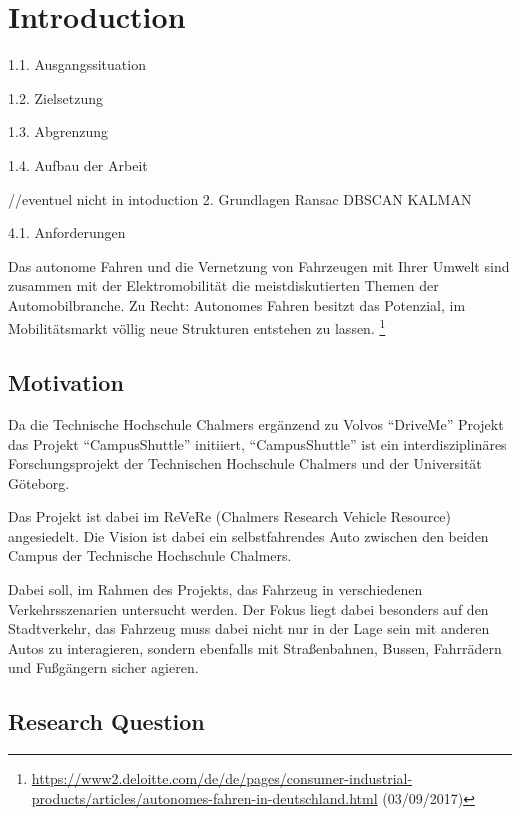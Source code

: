 \chapter{Introduction}


1.1. Ausgangssituation

1.2. Zielsetzung

1.3. Abgrenzung

1.4. Aufbau der Arbeit


//eventuel nicht in intoduction
2. Grundlagen
 Ransac
 DBSCAN
 KALMAN

 
4.1. Anforderungen


Das autonome Fahren und die Vernetzung von Fahrzeugen mit Ihrer Umwelt sind zusammen mit der Elektromobilität die meistdiskutierten Themen der Automobilbranche.
Zu Recht: Autonomes Fahren besitzt das Potenzial, im Mobilitätsmarkt völlig neue Strukturen entstehen zu lassen.
\footnote{\url{https://www2.deloitte.com/de/de/pages/consumer-industrial-products/articles/autonomes-fahren-in-deutschland.html} (03/09/2017)}

\section{Motivation}




Da die Technische Hochschule Chalmers ergänzend zu Volvos “DriveMe” Projekt das Projekt
“CampusShuttle” initiiert, “CampusShuttle” ist ein interdisziplinäres Forschungsprojekt
der Technischen Hochschule Chalmers und der Universität Göteborg.

Das Projekt ist dabei im ReVeRe (Chalmers Research Vehicle Resource) angesiedelt. Die Vision ist dabei ein selbstfahrendes
Auto zwischen den beiden Campus der Technische Hochschule Chalmers.

Dabei soll, im Rahmen des Projekts, das Fahrzeug in verschiedenen Verkehrsszenarien untersucht
werden. Der Fokus liegt dabei besonders auf den Stadtverkehr, das Fahrzeug muss dabei nicht
nur in der Lage sein mit anderen Autos zu interagieren, sondern ebenfalls mit Straßenbahnen,
Bussen, Fahrrädern und Fußgängern sicher agieren. 

\section{Research Question}

